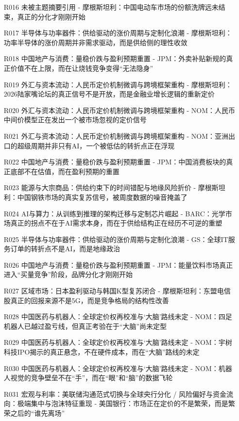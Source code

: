 \documentclass[11pt]{ctexart}
\begin{document}
\begin{itemize}
  \item [R016] 未被主题摘要引用 - 摩根斯坦利：中国电动车市场的份额洗牌远未结束，真正的分化才刚刚开始
  \item [R017] 半导体与功率器件：供给驱动的涨价周期与定制化浪潮 - 摩根斯坦利：功率半导体的涨价周期并非需求驱动，而是供给侧的理性收敛
  \item [R018] 中国地产与消费：量稳价跌与盈利预期重置 - JPM：外卖补贴新规的真正价值不在上限，而在让烧钱竞争变得“无法隐身”
  \item [R019] 外汇与资本流动：人民币定价机制微调与跨境框架重构 - 摩根斯坦利：2026陆家嘴论坛的真正信号不是开放，而是金融业增长逻辑的重新定价
  \item [R020] 外汇与资本流动：人民币定价机制微调与跨境框架重构 - NOM：人民币中间价模型正在发出一个被市场忽视的定价信号
  \item [R021] 外汇与资本流动：人民币定价机制微调与跨境框架重构 - NOM：亚洲出口的超级周期并非只有AI，一个被低估的转折点正在浮现
  \item [R022] 中国地产与消费：量稳价跌与盈利预期重置 - JPM：中国消费板块的真正底部不在估值，而在盈利预期的重置
  \item [R023] 能源与大宗商品：供给约束下的时间错配与地缘风险折价 - 摩根斯坦利：中国钢铁市场的真实复苏信号，被周度数据的噪音掩盖了
  \item [R024] AI与算力：从训练到推理的架构迁移与定制芯片崛起 - BARC：光学市场真正的拐点不在于AI需求本身，而在于供给结构正在经历不可逆的重塑
  \item [R025] 半导体与功率器件：供给驱动的涨价周期与定制化浪潮 - GS：全球IT服务订单的转折点不是AI，而是地缘政治
  \item [R026] 中国地产与消费：量稳价跌与盈利预期重置 - JPM：能量饮料市场真正进入“买量竞争”阶段，品牌分化才刚刚开始
  \item [R027] 区域市场：日本盈利驱动与韩国K型复苏闭合 - 摩根斯坦利：东盟电信股真正的回报来源不是5G，而是竞争格局的结构性改善
  \item [R028] 中国医药与机器人：全球定价权再校准与‘大脑’路线未定 - NOM：四足机器人已越过盈亏线，但真正考验在于“大脑”尚未定型
  \item [R029] 中国医药与机器人：全球定价权再校准与‘大脑’路线未定 - NOM：宇树科技IPO揭示的真正悬念，不在硬件成本，而在“大脑”路线的未定
  \item [R030] 中国医药与机器人：全球定价权再校准与‘大脑’路线未定 - NOM：机器人视觉的竞争壁垒不在“手”，而在“眼”和“脑”的数据飞轮
  \item [R031] 宏观与利率：美联储沟通范式切换与全球央行分化 / 风险偏好与资金流向：极端集中与泡沫特征重现 - 美国银行：市场正在定价的不是繁荣，而是繁荣之后的“谁先离场”

\end{itemize}
\end{document}
